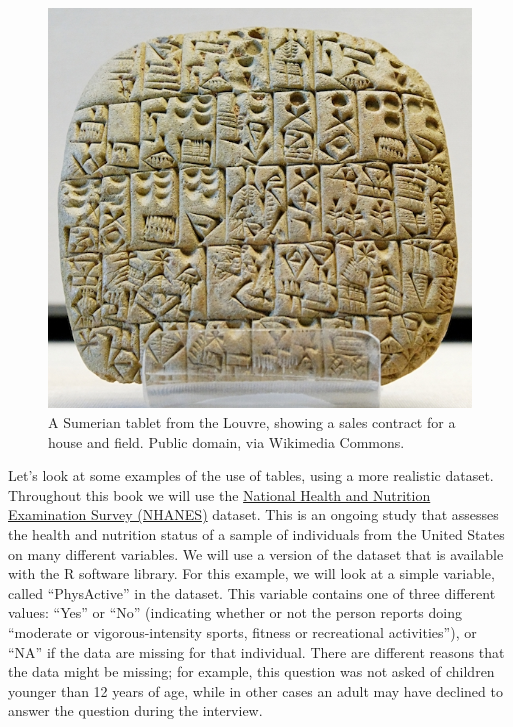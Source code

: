 \documentclass[12pt,]{book}
\theoremstyle{definition}
\theoremstyle{definition}
\theoremstyle{definition}
\theoremstyle{remark}
\begin{document}
\begin{figure}
\includegraphics[height=0.3\textheight]{images/Sales_contract_Shuruppak_Louvre_AO3760} \caption{A Sumerian tablet from the Louvre, showing a sales contract for a house and field.  Public domain, via Wikimedia Commons.}\label{fig:salesContract}
\end{figure}

Let's look at some examples of the use of tables, using a more realistic dataset. Throughout this book we will use the \href{https://www.cdc.gov/nchs/nhanes/index.htm}{National Health and Nutrition Examination Survey (NHANES)} dataset. This is an ongoing study that assesses the health and nutrition status of a sample of individuals from the United States on many different variables. We will use a version of the dataset that is available with the R software library. For this example, we will look at a simple variable, called ``PhysActive'' in the dataset. This variable contains one of three different values: ``Yes'' or ``No'' (indicating whether or not the person reports doing ``moderate or vigorous-intensity sports, fitness or recreational activities''), or ``NA'' if the data are missing for that individual. There are different reasons that the data might be missing; for example, this question was not asked of children younger than 12 years of age, while in other cases an adult may have declined to answer the question during the interview.
\end{document}
